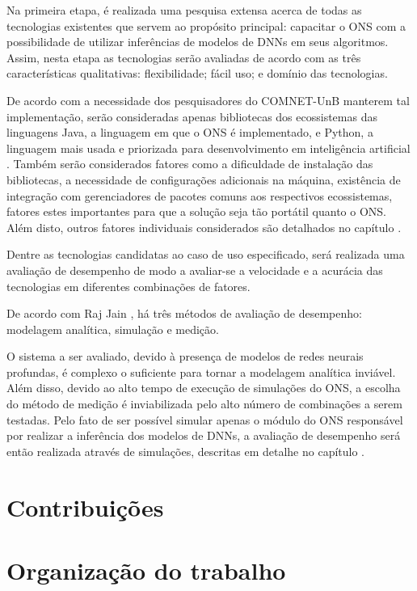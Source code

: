 Na primeira etapa, é realizada uma pesquisa extensa acerca de todas as tecnologias existentes que servem ao propósito principal: capacitar o ONS com a possibilidade de utilizar inferências de modelos de DNNs em seus algoritmos. Assim, nesta etapa as tecnologias serão avaliadas de acordo com as três características qualitativas: flexibilidade; fácil uso; e domínio das tecnologias.

De acordo com a necessidade dos pesquisadores do COMNET-UnB manterem tal implementação, serão consideradas apenas bibliotecas dos ecossistemas das linguagens Java, a linguagem em que o ONS é implementado, e Python, a linguagem mais usada e priorizada para desenvolvimento em inteligência artificial \cite{developer_nation_q1_2017}. Também serão considerados fatores como a dificuldade de instalação das bibliotecas, a necessidade de configurações adicionais na máquina, existência de integração com gerenciadores de pacotes comuns aos respectivos ecossistemas, fatores estes importantes para que a solução seja tão portátil quanto o ONS. Além disto, outros fatores individuais considerados são detalhados no capítulo .

Dentre as tecnologias candidatas ao caso de uso especificado, será realizada uma avaliação de desempenho de modo a avaliar-se a velocidade e a acurácia das tecnologias em diferentes combinações de fatores.

De acordo com Raj Jain \cite{jain1991art}, há três métodos de avaliação de desempenho: modelagem analítica, simulação e medição.

O sistema a ser avaliado, devido à presença de modelos de redes neurais profundas, é complexo o suficiente para tornar a modelagem analítica inviável. Além disso, devido ao alto tempo de execução de simulações do ONS, a escolha do método de medição é inviabilizada pelo alto número de combinações a serem testadas. Pelo fato de ser possível simular apenas o módulo do ONS responsável por realizar a inferência dos modelos de DNNs, a avaliação de desempenho será então realizada através de simulações, descritas em detalhe no capítulo \todo[Y (análise)].

\section{Contribuições}
\label{intro-contributions}

\section{Organização do trabalho}
\label{intro-org}

